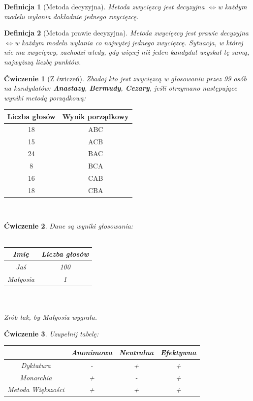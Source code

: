 \documentclass[12pt,a4paper]{article}
\theoremstyle{break}
\newtheorem{definition}{Definicja}[section]
\newtheorem{exercise}{Ćwiczenie}[section]
\newcommand{\witw}{$\Leftrightarrow$}
\begin{document}
\begin{definition}[Metoda decyzyjna]
	Metoda zwycięzcy jest decyzyjna \witw w każdym modelu wyłania dokładnie jednego zwycięzcę.
\end{definition}

\begin{definition}[Metoda prawie decyzyjna]
	Metoda zwycięzcy jest prawie decyzyjna \witw w każdym modelu wyłania co najwyżej jednego zwycięzcę. Sytuacja, w której nie ma zwycięzcy, zachodzi wtedy, gdy więcej niż jeden kandydat uzyskał tę samą, najwyższą liczbę punktów.
\end{definition}

\begin{exercise}[Z ćwiczeń]
	Zbadaj kto jest zwycięzcą w głosowaniu przez 99 osób na kandydatów: \textbf{Anastazy}, \textbf{Bermudy}, \textbf{Cezary}, jeśli otrzymano następujące wyniki metodą porządkową:
\end{exercise}

	\begin{tabular}{|c|c|}\hline
		Liczba głosów	& Wynik porządkowy\\\hline
		18        		& ABC\\\hline
		15    			& ACB\\\hline
		24     			& BAC\\\hline
		8 				& BCA\\\hline
		16     			& CAB\\\hline
		18 				& CBA\\\hline
	\end{tabular}\\
	
\begin{exercise}
	Dane są wyniki głosowania:\\\\
	\begin{tabular}{|c|c|}\hline
		Imię		& Liczba głosów\\\hline
		Jaś        	& 100\\\hline
		Małgosia    & 1\\\hline
	\end{tabular}\\\\
	Zrób tak, by Małgosia wygrała.
\end{exercise}

\begin{exercise}
	Uzupełnij tabelę:\\
	\begin{tabular}{|c|c|c|c|}\hline
		& Anonimowa & Neutralna & Efektywna\\\hline
		Dyktatura   &-&+&+\\\hline
		Monarchia   &+&-&+\\\hline
		Metoda Większości &+&+&+\\\hline
	\end{tabular}\\
\end{exercise}
\end{document}
